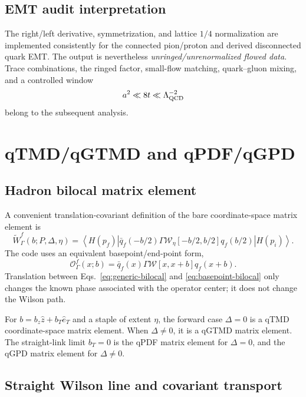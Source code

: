 \documentclass[11pt,a4paper]{article}
\numberwithin{equation}{section}
\newcommand{\avg}[1]{\left\langle #1\right\rangle}
\newcommand{\cO}{\mathcal{O}}
\newcommand{\cW}{\mathcal{W}}
\begin{document}
\subsection{EMT audit interpretation}

The right/left derivative, symmetrization, and lattice \(1/4\) normalization
are implemented consistently for the connected pion/proton and derived
disconnected quark EMT.  The output is nevertheless
\emph{unringed/unrenormalized flowed data}.  Trace combinations, the ringed
factor, small-flow matching, quark--gluon mixing, and a controlled window
\begin{equation}
 a^2\ll 8t\ll\Lambda_{\rm QCD}^{-2}
\end{equation}
belong to the subsequent analysis.

\section{qTMD/qGTMD and qPDF/qGPD}

\subsection{Hadron bilocal matrix element}

A convenient translation-covariant definition of the bare coordinate-space
matrix element is
\begin{equation}
 \widetilde W_\Gamma^f(b;P,\Delta,\eta)
 =
 \avg{H(p_f)|
 \bar q_f(-b/2)\Gamma
 \cW_\eta[-b/2,b/2]q_f(b/2)
 |H(p_i)}.
 \label{eq:generic-bilocal}
\end{equation}
The code uses an equivalent basepoint/end-point form,
\begin{equation}
 \cO_\Gamma^f(x;b)
 =\bar q_f(x)\Gamma\cW[x,x+b]q_f(x+b).
 \label{eq:basepoint-bilocal}
\end{equation}
Translation between Eqs.~\eqref{eq:generic-bilocal} and
\eqref{eq:basepoint-bilocal} only changes the known phase associated with the
operator center; it does not change the Wilson path.

For \(b=b_z\hat z+b_T\hat e_T\) and a staple of extent \(\eta\), the forward
case \(\Delta=0\) is a qTMD coordinate-space matrix element.  When
\(\Delta\neq0\), it is a qGTMD matrix element.  The straight-link limit
\(b_T=0\) is the qPDF matrix element for \(\Delta=0\), and the qGPD matrix
element for \(\Delta\neq0\).

\subsection{Straight Wilson line and covariant transport}
\end{document}
